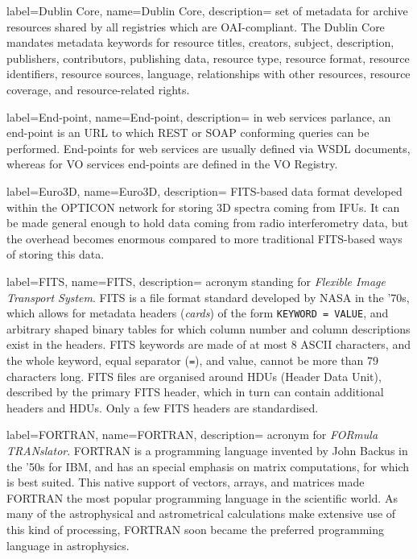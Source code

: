 {
    label={Dublin Core},
    name={Dublin Core},
    description={
    	set of \gls{metadata} for archive resources shared by all
        registries which are \gls{OAI}-compliant. The Dublin Core
        mandates metadata keywords for resource titles, creators,
        subject, description, publishers, contributors, publishing
        data, resource type, resource format, resource identifiers,
        resource sources, language, relationships with other resources,
        resource coverage, and resource-related rights.
    }
}

{
    label={End-point},
    name={End-point},
    description={
    	in \gls{web services} parlance, an end-point is an \gls{URL} to
        which \gls{REST} or \gls{SOAP} conforming queries can be
        performed. End-points for web services are usually defined via
        \gls{WSDL} documents, whereas for \gls{VO} services end-points
        are defined in the VO \gls{Registry}.
    }
}

{
    label={Euro3D},
    name={Euro3D},
    description={
    	\gls{FITS}-based data format developed within the \gls{OPTICON}
        network for storing 3D spectra coming from \gls{IFU}s. It can
        be made general enough to hold data coming from radio
        interferometry data, but the overhead becomes enormous compared
        to more traditional FITS-based ways of storing this data.
    }
}

{
    label={FITS},
    name={FITS},
    description={
    	acronym standing for \emph{Flexible Image Transport System}.
        FITS is a file format standard developed by NASA in the '70s,
        which allows for metadata headers (\emph{cards}) of the form
        \texttt{KEYWORD = VALUE}, and arbitrary shaped binary tables
        for which column number and column descriptions exist in the
        headers. FITS keywords are made of at most 8 ASCII characters,
        and the whole keyword, equal separator (\texttt{=}), and value,
        cannot be more than 79 characters long. FITS files are
        organised around HDUs (Header Data Unit), described by the
        primary FITS header, which in turn can contain additional
        headers and HDUs. Only a few FITS headers are standardised.
    }
}

{
    label={FORTRAN},
    name={FORTRAN},
    description={
    	acronym for \emph{FORmula TRANslator}. FORTRAN is a programming
        language invented by John Backus in the '50s for IBM, and has
        an special emphasis on matrix computations, for which is best
        suited. This native support of vectors, arrays, and matrices
        made FORTRAN the most popular programming language in the
        scientific world. As many of the astrophysical and
        astrometrical calculations make extensive use of this kind of
        processing, FORTRAN soon became the preferred programming
        language in astrophysics.
    }
}

